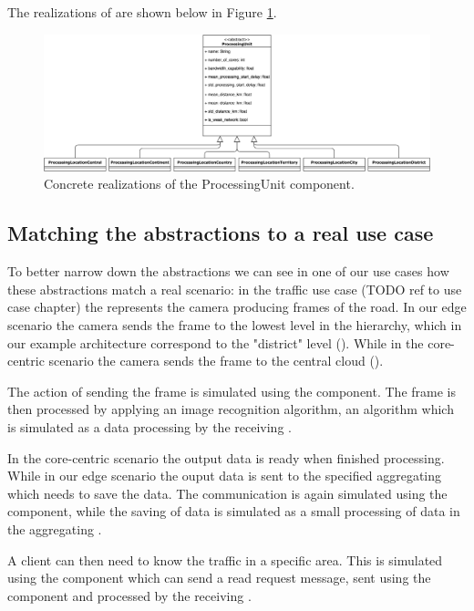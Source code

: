 The realizations of  are shown below in Figure \ref{fig:processing-unit-realizations}.

\begin{figure}[H]
    \centering
    \includegraphics[width=0.66\linewidth]{Figures/Evaluation/processing-unit-realizations.png}
    \caption{Concrete realizations of the ProcessingUnit component.}
    \label{fig:processing-unit-realizations}
\end{figure}


\subsection{Matching the abstractions to a real use case}
To better narrow down the abstractions we can see in one of our use cases how these abstractions match a real scenario: in the traffic use case (TODO ref to use case chapter) the  represents the camera producing frames of the road. In our edge scenario the camera sends the frame to the lowest level in the hierarchy, which in our example architecture correspond to the "district" level (). While in the core-centric scenario the camera sends the frame to the central cloud ().

The action of sending the frame is simulated using the  component. The frame is then processed by applying an image recognition algorithm, an algorithm which is simulated as a data processing by the receiving .

In the core-centric scenario the output data is ready when finished processing. While in our edge scenario the ouput data is sent to the specified aggregating  which needs to save the data. The communication is again simulated using the  component, while the saving of data is simulated as a small processing of data in the aggregating .

A client can then need to know the traffic in a specific area. This is simulated using the  component which can send a read request message, sent using the  component and processed by the receiving .


